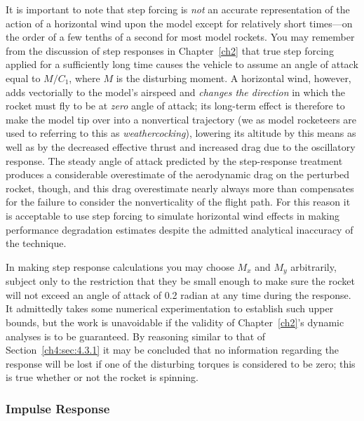 It is important to note that step forcing is \emph{not} an accurate representation of the action
of a horizontal wind upon the model except for relatively short times---on the order of a few
tenths of a second for most model rockets. You may remember from the discussion of step responses
in Chapter~\ref{ch2} that true step forcing applied for a sufficiently long time causes the vehicle
to assume an angle of attack equal to $M/C_1$, where $M$ is the disturbing moment. A horizontal
wind, however, adds vectorially to the model's airspeed and \emph{changes the direction} in which
the rocket must fly to be at \emph{zero} angle of attack; its long-term effect is therefore to make
the model tip over into a nonvertical trajectory (we as model rocketeers are used to referring to
this as \emph{weathercocking}), lowering its altitude by this means as well as by the decreased
effective thrust and increased drag due to the oscillatory response. The steady angle of attack
predicted by the step-response treatment produces a considerable overestimate of the aerodynamic
drag on the perturbed rocket, though, and this drag overestimate nearly always more than
compensates for the failure to consider the nonverticality of the flight path. For this reason it
is acceptable to use step forcing to simulate horizontal wind effects in making performance
degradation estimates despite the admitted analytical inaccuracy of the technique.

In making step response calculations you may choose $M_x$ and $M_y$ arbitrarily, subject only to
the restriction that they be small enough to make sure the rocket will not exceed an angle of
attack of 0.2 radian at any time during the response. It admittedly takes some numerical
experimentation to establish such upper bounds, but the work is unavoidable if the validity of
Chapter~\ref{ch2}'s dynamic analyses is to be guaranteed. By reasoning similar to that of
Section~\ref{ch4:sec:4.3.1} it may be concluded that no information regarding the response will be
lost if one of the disturbing torques is considered to be zero; this is true whether or not the
rocket is spinning.

\subsubsection{Impulse Response}\label{ch4:sec:4.3.3}

